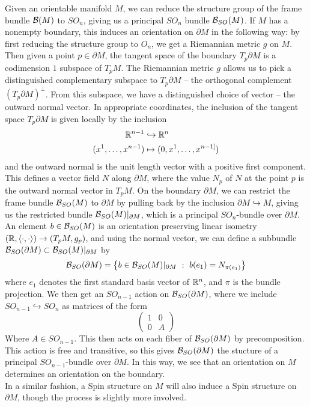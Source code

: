 %
Given an orientable manifold $M$, we can reduce the structure group
of the frame bundle $\mathcal{B}(M)$ to $SO_n$, giving us a principal $SO_n$ bundle
$\mathcal{B}_{SO}(M)$. If $M$ has a nonempty boundary, this induces an orientation on
$\partial M$ in the following way: by first reducing the structure group to $O_n$,
we get a Riemannian metric $g$ on $M$. Then given a point $p \in \partial M$,
the tangent space of the boundary $T_p\partial M$ is a codimension $1$ subspace
of $T_pM$. The Riemannian metric $g$ allows us to pick a distinguished complementary
subspace to $T_p\partial M$ -- the orthogonal complement $(T_p \partial M)^\perp$.
From this subspace, we have a distinguished choice of vector -- the outward
normal vector. In appropriate coordinates, the inclusion of the tangent space
$T_p\partial M$ is given locally by the inclusion
%
\begin{align*}
\mathbb{R}^{n-1} &\hookrightarrow \mathbb{R}^n \\
(x^1, \ldots, x^{n-1}) &\mapsto (0, x^1, \ldots, x^{n-1]})
\end{align*}
%
and the outward normal is the unit length vector with a positive first component.
This defines a vector field $N$ along $\partial M$, where the value $N_p$
of $N$ at the point $p$ is the outward normal vector in $T_pM$.
On the boundary $\partial M$, we can restrict the frame bundle $\mathcal{B}_{SO}(M)$
to $\partial M$ by pulling back by the inclusion $\partial M \hookrightarrow M$,
giving us the restricted bundle $\mathcal{B}_{SO}(M)\vert_{\partial M}$, which is a principal
$SO_n$-bundle over $\partial M$. An element $b \in \mathcal{B}_{SO}(M)$ is an orientation
preserving linear isometry $(\mathbb{R}, \langle \cdot,\cdot\rangle) \to (T_pM, g_p)$, and
using the normal vector, we can define a subbundle
$\mathcal{B}_{SO}(\partial M) \subset \mathcal{B}_{SO}(M)\vert_{\partial M}$ by
\[
\mathcal{B}_{SO}(\partial M) = \left\lbrace b \in \mathcal{B}_{SO}(M)\vert_{\partial M} ~:~
b(e_1) = N_{\pi(e_1)} \right\rbrace
\]
where $e_1$ denotes the first standard basis vector of $\mathbb{R}^n$, and $\pi$ is
the bundle projection. We then get an $SO_{n-1}$ action on $\mathcal{B}_{SO}(\partial M)$,
where we include $SO_{n-1} \hookrightarrow SO_n$ as matrices of the form
\[
\begin{pmatrix}
1 & 0 \\
0 & A
\end{pmatrix}
\]
Where $A \in SO_{n-1}$. This then acts on each fiber of $\mathcal{B}_{SO}(\partial M)$
by precomposition. This action is free and transitive, so this gives
$\mathcal{B}_{SO}(\partial M)$ the stucture of a principal $SO_{n-1}$-bundle over
$\partial M$. In this way, we see that an orientation on $M$ determines
an orientation on the boundary. \\

In a similar fashion, a Spin structure on $M$ will also induce a Spin structure
on $\partial M$, though the process is slightly more involved.
%
